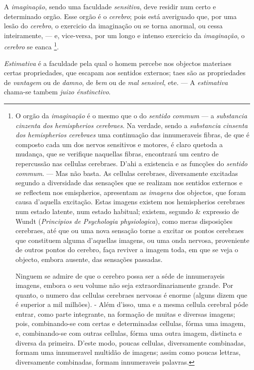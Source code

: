 
 
A \emph{imaginação}, sendo uma faculdade \emph{sensitiva}, deve residir num certo e determinado orgão. Esse orgão é o \emph{cerebro}; pois está averiguado que, por uma lesão do \emph{cerebro}, o exercicio da imaginação ou se torna anormal, ou cessa inteiramente, --- e, vice-versa, por um longo e intenso exercicio da \emph{imaginação}, o \emph{cerebro} se eanca \footnote{O orgão da \emph{imaginação} é o mesmo que o do \emph{sentido commum} --- a \emph{substancia cinzenta dos hemispherios cerebraes}. Na verdade, sendo a \emph{substancia cinsenta dos hemispherios cerebraes} uma continuação das innumeraveis fibras, de que é composto cada um dos nervos sensitivos e motores, é claro quetoda a mudança, que se verifique naquellas fibras, encontrará um centro de repercussão nas cellulas cerebraes. D'ahi a existencia e as funcções do \emph{sentido commum}. --- Mas não basta. As cellulas cerebraes, diversamente excitadas segundo a diversidade das sensações que se realizam nos sentidos externos e se reflectem nos emispherios, apresentam as \emph{imagens} dos objectos, que foram causa d'aquella excitação. Estas imagens existem nos hemispherios cerebraes num estado latente, num estado habitual; existem, segundo \& expressio de Wundt (\emph{Principios de Psychologia physiologica}), como meras disposições cerebraes, até que ou uma nova sensação torne a excitar os pontos cerebraes que constituem alguma d'aquellas imagens, ou uma onda nervosa, proveniente de outros pontos do cerebro, faça reviver a imagem toda, em que se veja o objecto, embora ausente, das sensações passadas.\par Ninguem se admire de que o cerebro possa ser a séde de innumerayeis imagens, embora o seu volume não seja extraordinariamente grande. Por quanto, o numero das cellulas cerebraes nervosas é enorme (alguns dizem que é superior a mil milhões). - Além d'isso, uma e a mesma cellula cerebral póde entrar, como parte integrante, na formação de muitas e diversas imagens; pois, combinando-se com certas e determinadas cellulas, fórma uma imagem, e, combinando-se com outras cellulas, fórma uma outra imagem, distincta e diversa da primeira. D'este modo, poucas cellulas, diversamente combinadas, formam uma innumeravel multidão de imagens; assim como poucas lettras, diversamente combinadas, formam innumeraveis palavras.}.


 
\emph{Estimativa} é a faculdade pela qual o homem percebe nos objectos materiaes certas propriedades, que escapam aos sentidos externos; taes são as propriedades de \emph{vantagem} ou de \emph{damno}, de \emph{bem} ou de \emph{mal sensivel}, ete. --- A \emph{estimativa} chama-se tambem \emph{juizo énstinctivo}.

